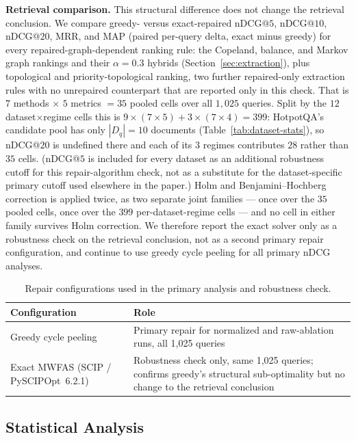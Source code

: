 \documentclass[manuscript,anonymous,review]{acmart}
\begin{document}
\textbf{Retrieval comparison.} This structural difference does not change
the retrieval conclusion. We compare greedy- versus exact-repaired nDCG@$5$,
nDCG@$10$, nDCG@$20$, MRR, and MAP (paired per-query delta, exact minus
greedy) for every repaired-graph-dependent ranking rule: the Copeland,
balance, and Markov graph rankings and their $\alpha=0.3$ hybrids
(Section~\ref{sec:extraction}), plus topological and priority-topological
ranking, two further repaired-only extraction rules with no unrepaired
counterpart that are reported only in this check. That is $7$ methods
$\times$ $5$ metrics $=35$ pooled cells over all $1{,}025$ queries. Split by
the $12$ dataset$\times$regime cells this is $9\times(7\times5)+3\times(7\times4)=399$:
HotpotQA's candidate pool has only $|D_q|=10$ documents
(Table~\ref{tab:dataset-stats}), so nDCG@$20$ is undefined there and each of
its $3$ regimes contributes $28$ rather than $35$ cells. (nDCG@$5$ is
included for every dataset as an additional robustness cutoff for this
repair-algorithm check, not as a substitute for the dataset-specific primary
cutoff used elsewhere in the paper.) Holm and Benjamini--Hochberg correction
is applied twice, as two separate joint families --- once over the $35$
pooled cells, once over the $399$ per-dataset-regime cells --- and no cell in
either family survives Holm correction. We therefore report the exact solver
only as a robustness check on the retrieval conclusion, not as a second
primary repair configuration, and continue to use greedy cycle peeling for
all primary nDCG analyses.

\begin{table}[t]
  \caption{Repair configurations used in the primary analysis and robustness
    check.}
  \label{tab:repair-variants}
  \begin{tabular}{p{4.2cm}p{9.5cm}}
    \toprule
    Configuration & Role \\
    \midrule
    Greedy cycle peeling & Primary repair for normalized and raw-ablation runs, all 1{,}025 queries \\
    Exact MWFAS (SCIP / PySCIPOpt~6.2.1) & Robustness check only, same 1{,}025 queries; confirms greedy's structural sub-optimality but no change to the retrieval conclusion \\
    \bottomrule
  \end{tabular}
\end{table}

\subsection{Statistical Analysis}
\label{sec:bootstrap}
\end{document}

